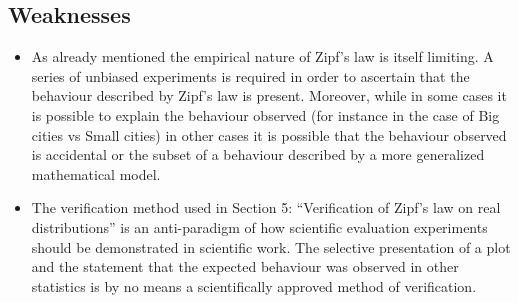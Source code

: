 \documentclass{article}
\begin{document}
\subsection{Weaknesses}
\begin{itemize}
\item As already mentioned the empirical nature of Zipf's law is
  itself limiting. A series of unbiased experiments is required in order to
  ascertain that the behaviour described by Zipf's law is
  present. Moreover, while in some cases it is possible to explain
  the behaviour observed (for instance in the case of Big cities vs
  Small cities) in other cases it is possible that the behaviour
  observed is accidental or the subset of a behaviour described by a
  more generalized mathematical model.
\item The verification method used in Section 5: ``Verification of
  Zipf's law on real distributions'' is an anti-paradigm of how
  scientific evaluation experiments should be demonstrated in
  scientific work. The selective presentation of a plot and the
  statement that the expected behaviour was observed in other
  statistics is by no means a scientifically approved method of verification.
\end{itemize}
\end{document}
